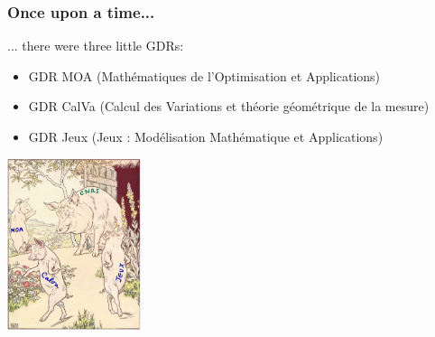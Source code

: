 \documentclass[9pt]{beamer}
\begin{document}
\begin{frame}
\frametitle{\bf Once upon a time...}
 
... there were three little GDRs:
\begin{itemize}
  \item GDR MOA (Math\'ematiques de l'Optimisation et Applications)
  \item GDR CalVa (Calcul des Variations et th\'eorie g\'eom\'etrique de la mesure)
  \item GDR Jeux (Jeux : Mod\'elisation Math\'ematique et Applications) 
\end{itemize}
 
\centering \includegraphics[height=5.0cm]{3-pigs}

\end{frame}
\end{document}
